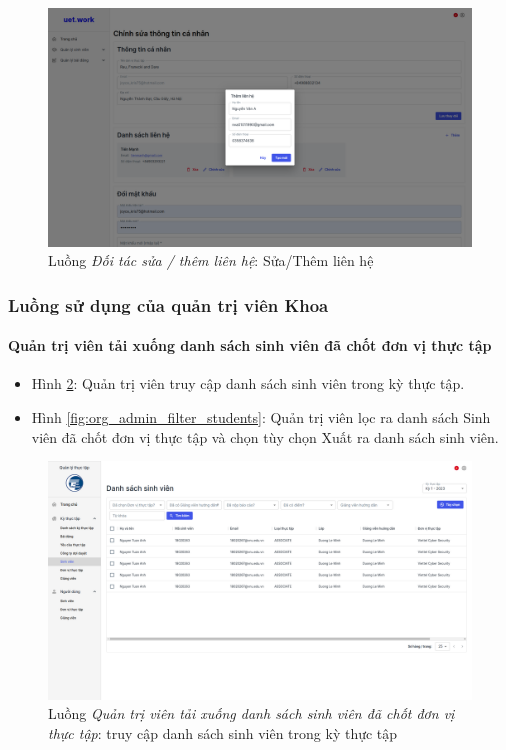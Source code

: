 \documentclass[./../main.tex]{subfiles}
\begin{document}
\begin{figure}[]
	\includegraphics[width=\linewidth]{./images/image48.png}
	\caption{Luồng \emph{Đối tác sửa / thêm liên hệ}: Sửa/Thêm liên hệ}
	\label{fig:partner_upsert_contact}
\end{figure}

\subsubsection{Luồng sử dụng của quản trị viên Khoa}

\paragraph*{Quản trị viên tải xuống danh sách sinh viên đã chốt đơn vị thực tập}

\begin{itemize}
	\item Hình \ref{fig:org_admin_access_list_intern_students}: Quản trị viên truy cập danh sách sinh viên trong kỳ thực tập.
	\item Hình \ref{fig:org_admin_filter_students}: Quản trị viên lọc ra danh sách Sinh viên đã chốt đơn vị thực tập và chọn tùy chọn Xuất ra danh sách sinh viên.
\end{itemize}

\begin{figure}[]
	\includegraphics[width=\linewidth]{./images/image75.png}
	\caption{Luồng \emph{Quản trị viên tải xuống danh sách sinh viên đã chốt đơn vị thực tập}: truy cập danh sách sinh viên trong kỳ thực tập}
	\label{fig:org_admin_access_list_intern_students}
\end{figure}
\end{document}
